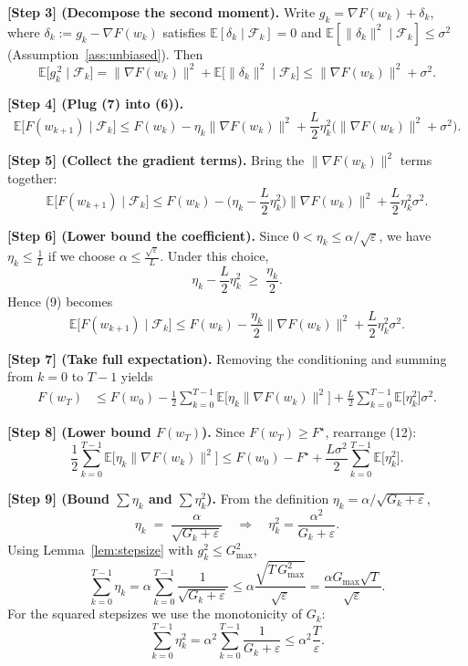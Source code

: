 \documentclass{article}
\newcommand{\E}{\mathbb{E}}
\begin{document}
\bigskip
\noindent\textbf{[Step 3] (Decompose the second moment).}  
Write $g_k=\nabla F(w_k)+\delta_k$, where $\delta_k:=g_k-\nabla F(w_k)$ satisfies $\E[\delta_k\mid\mathcal{F}_k]=0$ and $\E[\|\delta_k\|^{2}\mid\mathcal{F}_k]\le\sigma^{2}$ (Assumption~\ref{ass:unbiased}).  Then
\[
\E\!\big[g_k^{\,2}\mid\mathcal{F}_k\big]
=\|\nabla F(w_k)\|^{2}+\E\!\big[\|\delta_k\|^{2}\mid\mathcal{F}_k\big]
\le \|\nabla F(w_k)\|^{2}+\sigma^{2}.
\tag{7}
\]

\bigskip
\noindent\textbf{[Step 4] (Plug (7) into (6)).}
\[
\E\!\big[F(w_{k+1})\mid\mathcal{F}_k\big]
\le F(w_k)-\eta_k\|\nabla F(w_k)\|^{2}
   +\frac{L}{2}\eta_k^{2}\big(\|\nabla F(w_k)\|^{2}+\sigma^{2}\big).
\tag{8}
\]

\bigskip
\noindent\textbf{[Step 5] (Collect the gradient terms).}
Bring the $\|\nabla F(w_k)\|^{2}$ terms together:
\[
\E\!\big[F(w_{k+1})\mid\mathcal{F}_k\big]
\le F(w_k)-\Big(\eta_k-\frac{L}{2}\eta_k^{2}\Big)\|\nabla F(w_k)\|^{2}
   +\frac{L}{2}\eta_k^{2}\sigma^{2}.
\tag{9}
\]

\bigskip
\noindent\textbf{[Step 6] (Lower bound the coefficient).}  
Since $0<\eta_k\le\alpha/\sqrt{\varepsilon}$, we have $\eta_k\le\frac{1}{L}$ if we choose $\alpha\le\frac{\sqrt{\varepsilon}}{L}$.  Under this choice,
\[
\eta_k-\frac{L}{2}\eta_k^{2}
\;\ge\;\frac{\eta_k}{2}.
\tag{10}
\]
Hence (9) becomes
\[
\E\!\big[F(w_{k+1})\mid\mathcal{F}_k\big]
\le F(w_k)-\frac{\eta_k}{2}\|\nabla F(w_k)\|^{2}
   +\frac{L}{2}\eta_k^{2}\sigma^{2}.
\tag{11}
\]

\bigskip
\noindent\textbf{[Step 7] (Take full expectation).}  
Removing the conditioning and summing from $k=0$ to $T-1$ yields
\[
\begin{aligned}
F(w_T)
&\le F(w_0)-\frac12\sum_{k=0}^{T-1}\E\!\big[\eta_k\|\nabla F(w_k)\|^{2}\big]
   +\frac{L}{2}\sum_{k=0}^{T-1}\E\!\big[\eta_k^{2}\big]\sigma^{2}.
\end{aligned}
\tag{12}
\]

\bigskip
\noindent\textbf{[Step 8] (Lower bound $F(w_T)$).}  
Since $F(w_T)\ge F^\star$, rearrange (12):
\[
\frac12\sum_{k=0}^{T-1}\E\!\big[\eta_k\|\nabla F(w_k)\|^{2}\big]
\le F(w_0)-F^\star
   +\frac{L\sigma^{2}}{2}\sum_{k=0}^{T-1}\E\!\big[\eta_k^{2}\big].
\tag{13}
\]

\bigskip
\noindent\textbf{[Step 9] (Bound $\sum\eta_k$ and $\sum\eta_k^{2}$).}  
From the definition $\eta_k=\alpha/\sqrt{G_k+\varepsilon}$,
\[
\eta_k\;=\;\frac{\alpha}{\sqrt{G_k+\varepsilon}}
\quad\Longrightarrow\quad 
\eta_k^{2}= \frac{\alpha^{2}}{G_k+\varepsilon}.
\]
Using Lemma~\ref{lem:stepsize} with $g_k^{2}\le G_{\max}^{2}$,
\[
\sum_{k=0}^{T-1}\eta_k
= \alpha\sum_{k=0}^{T-1}\frac{1}{\sqrt{G_k+\varepsilon}}
\le \alpha\frac{\sqrt{T\,G_{\max}^{2}}}{\sqrt{\varepsilon}}
= \frac{\alpha G_{\max}\sqrt{T}}{\sqrt{\varepsilon}}.
\tag{14}
\]
For the squared stepsizes we use the monotonicity of $G_k$:
\[
\sum_{k=0}^{T-1}\eta_k^{2}
= \alpha^{2}\sum_{k=0}^{T-1}\frac{1}{G_k+\varepsilon}
\le \alpha^{2}\frac{T}{\varepsilon}.
\tag{15}
\]
\end{document}
